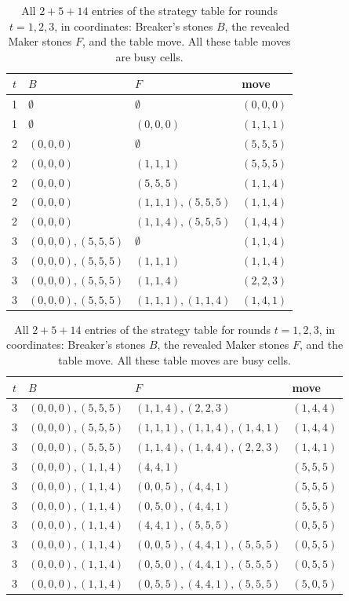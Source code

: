 \begin{table}[ht]
\centering\footnotesize
\begin{tabular}[t]{@{}clll@{}}
\toprule
$t$ & $B$ & $F$ & move\\
\midrule
1 & $\emptyset$ & $\emptyset$ & $(0,0,0)$\\
1 & $\emptyset$ & $(0,0,0)$ & $(1,1,1)$\\
\midrule
2 & $(0,0,0)$ & $\emptyset$ & $(5,5,5)$\\
2 & $(0,0,0)$ & $(1,1,1)$ & $(5,5,5)$\\
2 & $(0,0,0)$ & $(5,5,5)$ & $(1,1,4)$\\
2 & $(0,0,0)$ & $(1,1,1),(5,5,5)$ & $(1,1,4)$\\
2 & $(0,0,0)$ & $(1,1,4),(5,5,5)$ & $(1,4,4)$\\
\midrule
3 & $(0,0,0),(5,5,5)$ & $\emptyset$ & $(1,1,4)$\\
3 & $(0,0,0),(5,5,5)$ & $(1,1,1)$ & $(1,1,4)$\\
3 & $(0,0,0),(5,5,5)$ & $(1,1,4)$ & $(2,2,3)$\\
3 & $(0,0,0),(5,5,5)$ & $(1,1,1),(1,1,4)$ & $(1,4,1)$\\
\bottomrule
\end{tabular}\hfill
\begin{tabular}[t]{@{}clll@{}}
\toprule
$t$ & $B$ & $F$ & move\\
\midrule
3 & $(0,0,0),(5,5,5)$ & $(1,1,4),(2,2,3)$ & $(1,4,4)$\\
3 & $(0,0,0),(5,5,5)$ & $(1,1,1),(1,1,4),(1,4,1)$ & $(1,4,4)$\\
3 & $(0,0,0),(5,5,5)$ & $(1,1,4),(1,4,4),(2,2,3)$ & $(1,4,1)$\\
3 & $(0,0,0),(1,1,4)$ & $(4,4,1)$ & $(5,5,5)$\\
3 & $(0,0,0),(1,1,4)$ & $(0,0,5),(4,4,1)$ & $(5,5,5)$\\
3 & $(0,0,0),(1,1,4)$ & $(0,5,0),(4,4,1)$ & $(5,5,5)$\\
3 & $(0,0,0),(1,1,4)$ & $(4,4,1),(5,5,5)$ & $(0,5,5)$\\
3 & $(0,0,0),(1,1,4)$ & $(0,0,5),(4,4,1),(5,5,5)$ & $(0,5,5)$\\
3 & $(0,0,0),(1,1,4)$ & $(0,5,0),(4,4,1),(5,5,5)$ & $(0,5,5)$\\
3 & $(0,0,0),(1,1,4)$ & $(0,5,5),(4,4,1),(5,5,5)$ & $(5,0,5)$\\
\bottomrule
\end{tabular}
\caption{All $2+5+14$ entries of the strategy table for rounds $t=1,2,3$, in coordinates: Breaker's stones
$B$, the revealed Maker stones $F$, and the table move. All these table moves are busy cells.}
\label{tab:opening}
\end{table}

